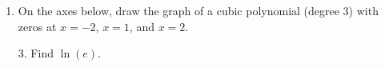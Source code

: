 \documentclass[11pt]{article}
\begin{document}
\pagestyle{empty}
\newsavebox{\quizfront}
\begin{lrbox}{\quizfront}
\begin{minipage}[top][4.5in][t]{\textwidth} \setlength{\parindent}{1.5em}
\drawtitle
\vspace{-0.5in}
\begin{enumerate}

\item On the axes below, draw the graph of a cubic polynomial (degree 3)
  with zeros at $x=-2$, $x=1$, and $x=2$.

  \vfill
  
  \begin{center}
  \end{center}
  \vfill

\end{enumerate}



\end{minipage}
\end{lrbox}

\newsavebox{\quizback}
\begin{lrbox}{\quizback}
\begin{minipage}[top][4.5in][t]{\textwidth} \setlength{\parindent}{1.5em}
\begin{itemize}
 \item[3.] Find $\ln(e)$. 


\end{itemize}
\end{minipage}
\end{lrbox}

\noindent \usebox{\quizfront}
\vfill
\noindent \usebox{\quizfront}

\end{document}
